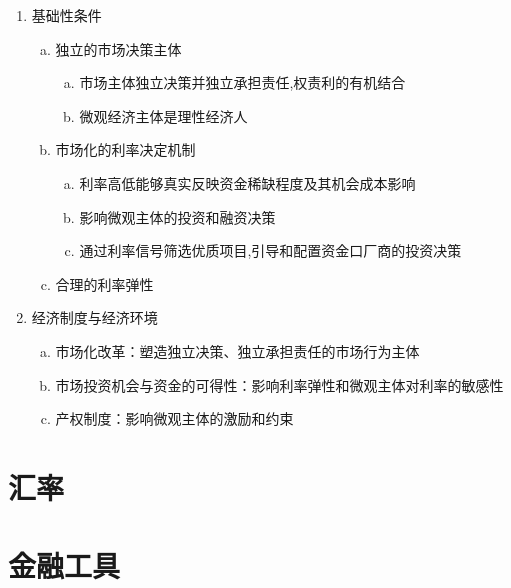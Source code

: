 \documentclass[12pt]{book}
\begin{document}
\begin{enumerate}[(1)]
    \item 基础性条件
          \begin{enumerate}[a.]
              \item 独立的市场决策主体
                    \begin{enumerate}[(a)]
                        \item 市场主体独立决策并独立承担责任,权责利的有机结合
                        \item 微观经济主体是理性经济人
                    \end{enumerate}
              \item 市场化的利率决定机制
                    \begin{enumerate}[(a)]
                        \item 利率高低能够真实反映资金稀缺程度及其机会成本影响
                        \item 影响微观主体的投资和融资决策
                        \item 通过利率信号筛选优质项目,引导和配置资金口厂商的投资决策
                    \end{enumerate}
              \item 合理的利率弹性
          \end{enumerate}
    \item 经济制度与经济环境
          \begin{enumerate}[a.]
              \item 市场化改革：塑造独立决策、独立承担责任的市场行为主体
              \item 市场投资机会与资金的可得性：影响利率弹性和微观主体对利率的敏感性
              \item 产权制度：影响微观主体的激励和约束
          \end{enumerate}
\end{enumerate}













\chapter{汇率}




\chapter{金融工具}
\end{document}
